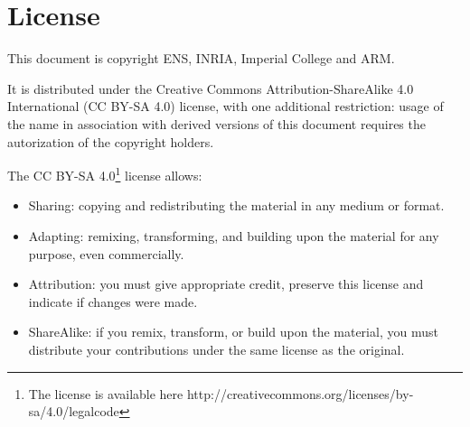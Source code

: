 \newpage

\section{License}
\label{license}

This document is copyright ENS, INRIA, Imperial College and ARM.

It is distributed under the Creative Commons Attribution-ShareAlike
4.0 International (CC BY-SA 4.0) license, with one additional
restriction: usage of the name \pencil in association with derived
versions of this document requires the autorization of the copyright
holders.

The CC BY-SA 4.0\footnote{The license is available here
http://creativecommons.org/licenses/by-sa/4.0/legalcode} license allows:
\begin{itemize}
 \item Sharing: copying and redistributing the material in any medium or
 format.
 \item Adapting: remixing, transforming, and building upon the material
 for any purpose, even commercially.
 \item Attribution: you must give appropriate credit, preserve
 this license and indicate if changes were made.
 \item ShareAlike: if you remix, transform, or build upon the material,
 you must distribute your contributions under the same license as the
 original.
\end{itemize}

